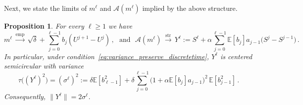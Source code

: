 \documentclass[11pt]{article}
\newtheorem{proposition}[theorem]{Proposition}
\theoremstyle{definition}
\theoremstyle{remark}
\numberwithin{equation}{section}
\numberwithin{theorem}{section}
\newcommand{\E}{\mathbb E}
\newcommand{\cA}{\mathcal A}
\begin{document}
Next, we state the limits of $m^\ell$ and $\cA(m^\ell)$ implied by the above structure. 
%
\begin{proposition}\label{prop:m_A_limits}
	For every $\ell \ge 1$ we have 
	\begin{equation}\label{eq:m_A_limits}
	m^\ell \,\xrightarrow{\mathrm{emp}}\, \sqrt{\delta} + \sum_{j=0}^{\ell-1} b_{j} (U^{j+1} - U^j)\,,~~~
	\mbox{and}~~~\cA(m^\ell) \,\xrightarrow{\mathrm{str}}\, Y^{\ell} := S^{\ell} + \alpha \sum_{j=0}^{\ell-1} \E[b_{j}] a_{j-1} \big(S^j - S^{j-1}\big)\,.
	\end{equation} 
	In particular, under condition~\eqref{eq:variance_preserve_discretetime}, $Y^\ell$ is centered semicircular with variance 
	\begin{equation}\label{eq:semicircular_variance}
		\tau\big((Y^\ell)^2\big) =( \sigma^\ell)^2
		:=  \delta \E[b_{\ell-1}^2] + \delta \sum_{j=0}^{\ell-1}\big(1 + \alpha \E[b_j]a_{j-1}\big)^2 \,\E[b_{j-1}^2]\,.
	\end{equation}
	Consequently,  $\|Y^{\ell}\| = 2\sigma^\ell$.
\end{proposition}
%
\end{document}
